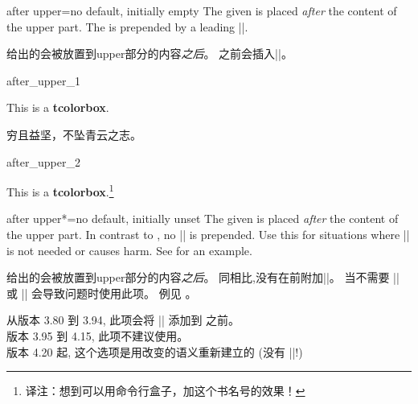 \begin{docTcbKey}[][doc updated=2016-10-21]{after upper}{=}{no default, initially empty}
The given  is placed \emph{after} the content of the upper part.
The  is prepended by a leading |\unskip|.

给出的会被放置到upper部分的内容\emph{之后}。
之前会插入|\unskip|。

\begin{exdispExample}{after_upper_1}

\begin{tcolorbox}[title=My title]
This is a \textbf{tcolorbox}.
\end{tcolorbox}

\begin{tcolorbox}[after upper={\par\hfill---\textit{王勃}}]
穷且益坚，不坠青云之志。
\end{tcolorbox}
\end{exdispExample}

\begin{exdispExample}{after_upper_2}
\begin{tcolorbox}[before upper=\flqq,after upper=\frqq,
colback=red!5!white,colframe=red!75!black]
This is a \textbf{tcolorbox}.\footnote{译注：想到可以用命令行盒子，加这个书名号的效果！}
\end{tcolorbox}
\end{exdispExample}
\end{docTcbKey}




\begin{docTcbKey}[][doc new and updated={2016-10-21}{2019-02-28}]{after upper*}{=}{no default, initially unset}
The given  is placed \emph{after} the content of the upper part.
In contrast to , no |\unskip| is prepended.
Use this for situations where |\unskip| is not needed or causes harm.
See  for an example.

给出的会被放置到upper部分的内容\emph{之后}。%
同相比,没有在前附加|\unskip|。%
当不需要 |\unskip| 或 |\unskip| 会导致问题时使用此项。%
例见 。

\begin{marker}
从版本 3.80 到 3.94, 此项会将 |\unskip| 添加到  之前。\\
版本 3.95 到 4.15, 此项不建议使用。\\
版本 4.20 起, 这个选项是用改变的语义重新建立的 (没有 |\unskip|!)
\end{marker}
\end{docTcbKey}





